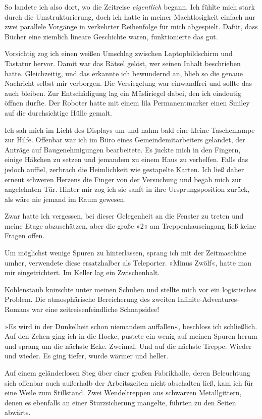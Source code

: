 So landete ich also dort, wo die Zeitreise \emph{eigentlich} begann. Ich fühlte mich stark durch die Umstrukturierung, doch ich hatte in meiner Machtlosigkeit einfach nur zwei parallele Vorgänge in verkehrter Reihenfolge für mich abgespielt. Dafür, dass Bücher eine ziemlich lineare Geschichte waren, funktionierte das gut.

Vorsichtig zog ich einen weißen Umschlag zwischen Laptopbildschirm und Tastatur hervor. Damit war das Rätsel gelöst, wer seinen Inhalt beschrieben hatte. Gleichzeitig, und das erkannte ich bewundernd an, blieb so die genaue Nachricht selbst mir verborgen. Die Versiegelung war einwandfrei und sollte das auch bleiben. Zur Entschädigung lag ein Müsliriegel dabei, den ich eindeutig öffnen durfte. Der Roboter hatte mit einem lila Permanentmarker einen Smiley auf die durchsichtige Hülle gemalt.

Ich sah mich im Licht des Displays um und nahm bald eine kleine Taschenlampe zur Hilfe. Offenbar war ich im Büro eines Gemeindemitarbeiters gelandet, der Anträge auf Baugenehmigungen bearbeitete. Es juckte mich in den Fingern, einige Häkchen zu setzen und jemandem zu einem Haus zu verhelfen. Falls das jedoch auffiel, zerbrach die Heimlichkeit wie gestapelte Karten. Ich ließ daher erneut schweren Herzens die Finger von der Versuchung und begab mich zur angelehnten Tür. Hinter mir zog ich sie sanft in ihre Ursprungsposition zurück, als wäre nie jemand im Raum gewesen.

Zwar hatte ich vergessen, bei dieser Gelegenheit an die Fenster zu treten und meine Etage abzuschätzen, aber die große »2« am Treppenhauseingang ließ keine Fragen offen.

Um möglichst wenige Spuren zu hinterlassen, sprang ich mit der Zeitmaschine umher, verwendete diese ersatzhalber als Teleporter. »Minus Zwölf«, hatte man mir eingetrichtert. Im Keller lag ein Zwischenhalt.

Kohlenstaub knirschte unter meinen Schuhen und stellte mich vor ein logistisches Problem. Die atmosphärische Bereicherung des zweiten Infinite-Adventures-Romans war eine zeitreisenfeindliche Schnapsidee!

»Es wird in der Dunkelheit schon niemandem auffallen«, beschloss ich schließlich. Auf den Zehen ging ich in die Hocke, pustete ein wenig auf meinen Spuren herum und sprang um die nächste Ecke. Zweimal. Und auf die nächste Treppe. Wieder und wieder. Es ging tiefer, wurde wärmer und heller.

Auf einem geländerlosen Steg über einer großen Fabrikhalle, deren Beleuchtung sich offenbar auch außerhalb der Arbeitszeiten nicht abschalten ließ, kam ich für eine Weile zum Stillstand. Zwei Wendeltreppen aus schwarzen Metallgittern, denen es ebenfalls an einer Sturzsicherung mangelte, führten zu den Seiten abwärts.

